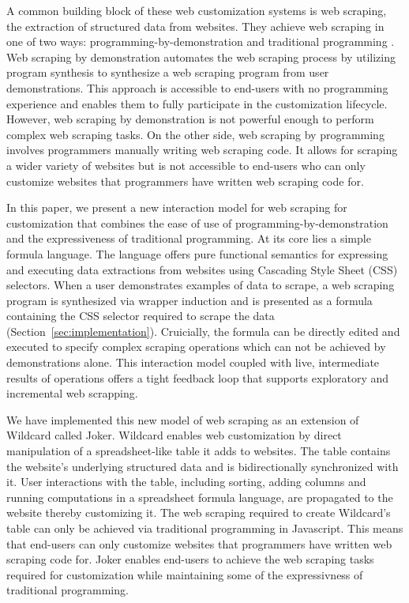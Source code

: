 \documentclass[sigconf,10pt]{acmart}
\begin{document}
A common building block of these web customization systems is web
scraping, the extraction of structured data from websites. They achieve
web scraping in one of two ways: programming-by-demonstration
\citep{huynh2006, lin2009} and traditional programming
\citep{litt2020, litt2020b}. Web scraping by demonstration automates the
web scraping process by utilizing program synthesis to synthesize a web
scraping program from user demonstrations. This approach is accessible
to end-users with no programming experience and enables them to fully
participate in the customization lifecycle. However, web scraping by
demonstration is not powerful enough to perform complex web scraping
tasks. On the other side, web scraping by programming involves
programmers manually writing web scraping code. It allows for scraping a
wider variety of websites but is not accessible to end-users who can
only customize websites that programmers have written web scraping code
for.

In this paper, we present a new interaction model for web scraping for
customization that combines the ease of use of
programming-by-demonstration and the expressiveness of traditional
programming. At its core lies a simple formula language. The language
offers pure functional semantics for expressing and executing data
extractions from websites using Cascading Style Sheet (CSS) selectors.
When a user demonstrates examples of data to scrape, a web scraping
program is synthesized via wrapper induction \citep{kushmerick2000} and
is presented as a formula containing the CSS selector required to scrape
the data (Section~\ref{sec:implementation}). Cruicially, the formula can
be directly edited and executed to specify complex scraping operations
which can not be achieved by demonstrations alone. This interaction
model coupled with live, intermediate results of operations offers a
tight feedback loop that supports exploratory and incremental web
scrapping.

We have implemented this new model of web scraping as an extension of
Wildcard \citep{litt2020, litt2020b} called Joker. Wildcard enables web
customization by direct manipulation of a spreadsheet-like table it adds
to websites. The table contains the website's underlying structured data
and is bidirectionally synchronized with it. User interactions with the
table, including sorting, adding columns and running computations in a
spreadsheet formula language, are propagated to the website thereby
customizing it. The web scraping required to create Wildcard's table can
only be achieved via traditional programming in Javascript. This means
that end-users can only customize websites that programmers have written
web scraping code for. Joker enables end-users to achieve the web
scraping tasks required for customization while maintaining some of the
expressivness of traditional programming.
\end{document}
